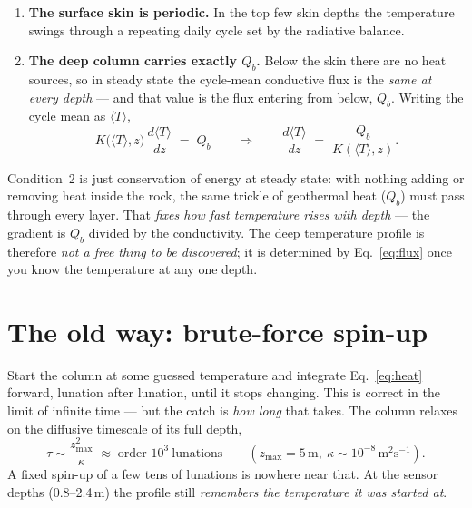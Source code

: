 \documentclass[11pt]{article}
\newcommand{\Tm}{\langle T\rangle}
\begin{document}
\begin{enumerate}[leftmargin=1.6em,itemsep=2pt]
\item \textbf{The surface skin is periodic.} In the top few skin depths the
temperature swings through a repeating daily cycle set by the radiative
balance.
\item \textbf{The deep column carries exactly $Q_b$.} Below the skin there
are no heat sources, so in steady state the cycle-mean conductive flux is the
\emph{same at every depth} --- and that value is the flux entering from below,
$Q_b$. Writing the cycle mean as $\Tm$,
\begin{equation}
K\bigl(\Tm,z\bigr)\,\frac{d\Tm}{dz} \;=\; Q_b
\qquad\Longrightarrow\qquad
\frac{d\Tm}{dz} \;=\; \frac{Q_b}{K(\Tm,z)} .
\label{eq:flux}
\end{equation}
\end{enumerate}

\begin{plain}
Condition~2 is just conservation of energy at steady state: with nothing
adding or removing heat inside the rock, the same trickle of geothermal heat
($Q_b$) must pass through every layer. That \emph{fixes how fast temperature
rises with depth} --- the gradient is $Q_b$ divided by the conductivity. The
deep temperature profile is therefore \emph{not a free thing to be
discovered}; it is determined by Eq.~\eqref{eq:flux} once you know the
temperature at any one depth.
\end{plain}

\section{The old way: brute-force spin-up}

Start the column at some guessed temperature and integrate
Eq.~\eqref{eq:heat} forward, lunation after lunation, until it stops
changing. This is correct in the limit of infinite time --- but the catch is
\emph{how long} that takes. The column relaxes on the diffusive timescale of
its full depth,
\begin{equation}
\tau \sim \frac{z_{\max}^2}{\kappa}
\;\approx\; \text{order } 10^{3}\ \text{lunations}
\qquad (z_{\max}=5\,\text{m},\ \kappa\sim10^{-8}\,\text{m}^2\text{s}^{-1}).
\end{equation}
A fixed spin-up of a few tens of lunations is nowhere near that. At the
sensor depths (0.8--2.4\,m) the profile still \emph{remembers the temperature
it was started at}.
\end{document}
